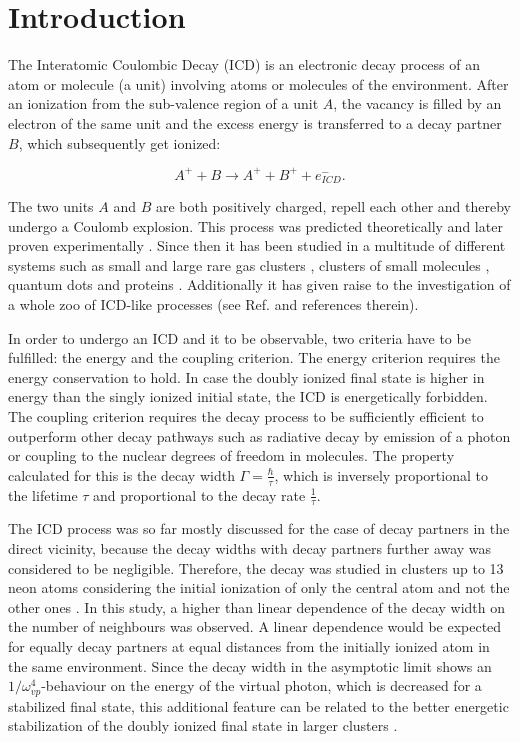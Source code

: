 \section{Introduction}

The Interatomic Coulombic Decay (ICD) is an electronic decay process of an atom or
molecule (a unit) involving atoms or molecules of the environment. After an
ionization from the sub-valence region of a unit $A$, the vacancy is filled
by an electron of the same unit and the excess energy is transferred to a decay
partner $B$, which subsequently get ionized:

\begin{equation*}
 A^+ + B \rightarrow A^+ + B^+ + e^-_{ICD}  .
\end{equation*}

The two units $A$ and $B$ are both positively charged, repell each other and
thereby undergo a Coulomb explosion. This process was predicted theoretically
\cite{Cederbaum97} and later proven experimentally \cite{Marburger03}. Since then
it has been studied in a multitude of different systems such as small and large
rare gas clusters \cite{many,Fasshauer14_1},
clusters of small molecules \cite{},
quantum dots \cite{Bande13}
and proteins \cite{Harbach13}. Additionally it has given raise to
the investigation of a whole zoo of ICD-like processes (see Ref. \cite{}
and references therein).

In order to undergo an ICD and it to be observable, two criteria have to
be fulfilled: the energy and the coupling criterion. The energy criterion
requires the energy conservation to hold. In case the doubly ionized final
state is higher in energy than the singly ionized initial state, the ICD
is energetically forbidden. The coupling criterion requires the decay
process to be sufficiently efficient to outperform other decay pathways
such as radiative decay by emission of a photon or coupling to the nuclear
degrees of freedom in molecules. The property calculated for this is the
decay width $\Gamma = \frac{\hbar}{\tau}$, which is inversely proportional
to the lifetime $\tau$ and proportional to the decay rate $\frac{1}{\tau}$.

The ICD process was so far mostly discussed for the case of decay partners in
the direct vicinity, because the decay widths with decay partners further away
was considered to be negligible. Therefore, the decay was studied in clusters
up to 13 neon atoms considering the initial ionization of only the central
atom and not the other ones \cite{Santra01_3}. In this study, a higher than
linear dependence of the decay width on the number of neighbours was
observed. A linear dependence would be expected for equally decay partners
at equal distances from the initially ionized atom in the same environment.
Since the decay width in the asymptotic limit shows an 
$1/\omega^{4}_{vp}$-behaviour on the energy of the virtual photon, which
is decreased for a stabilized final state, this additional feature
can be related to
the better energetic stabilization of the doubly ionized
final state in larger clusters \cite{Fasshauer13}.

